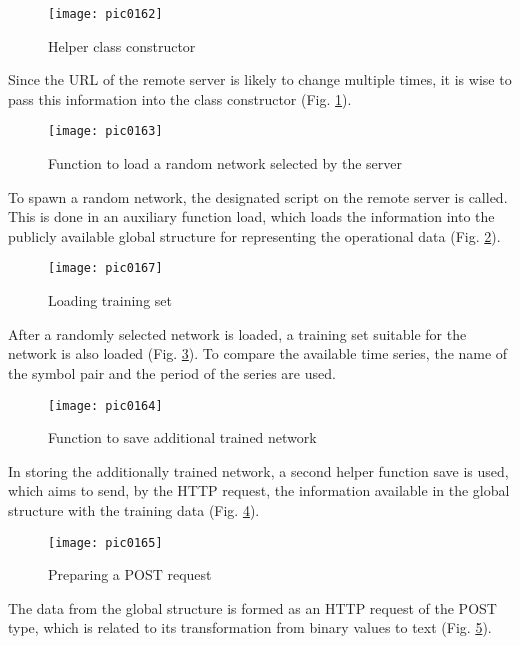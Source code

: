 \begin{figure}[h]
\centering
\texttt{[image: pic0162]}
\caption{Helper class constructor}
\label{fig:pic0162}
\end{figure}
\FloatBarrier

Since the URL of the remote server is likely to change multiple times, it is wise to pass this information into the class constructor (Fig. \ref{fig:pic0162}).

\begin{figure}[h]
\centering
\texttt{[image: pic0163]}
\caption{Function to load a random network selected by the server}
\label{fig:pic0163}
\end{figure}
\FloatBarrier

To spawn a random network, the designated script on the remote server is called. This is done in an auxiliary function load, which loads the information into the publicly available global structure for representing the operational data (Fig. \ref{fig:pic0163}).

\begin{figure}[h]
\centering
\texttt{[image: pic0167]}
\caption{Loading training set}
\label{fig:pic0167}
\end{figure}
\FloatBarrier

After a randomly selected network is loaded, a training set suitable for the network is also loaded (Fig. \ref{fig:pic0167}). To compare the available time series, the name of the symbol pair and the period of the series are used.

\begin{figure}[h]
\centering
\texttt{[image: pic0164]}
\caption{Function to save additional trained network}
\label{fig:pic0164}
\end{figure}
\FloatBarrier

In storing the additionally trained network, a second helper function save is used, which aims to send, by the HTTP request, the information available in the global structure with the training data (Fig. \ref{fig:pic0164}).

\begin{figure}[h]
\centering
\texttt{[image: pic0165]}
\caption{Preparing a POST request}
\label{fig:pic0165}
\end{figure}
\FloatBarrier

The data from the global structure is formed as an HTTP request of the POST type, which is related to its transformation from binary values to text (Fig. \ref{fig:pic0165}).

